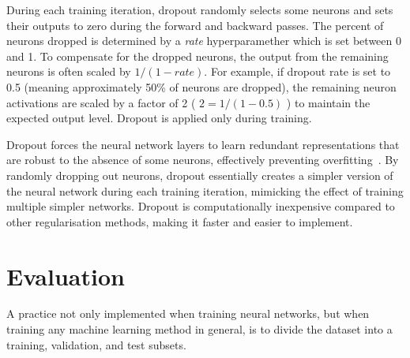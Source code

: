 During each training iteration, dropout randomly selects some neurons and sets their outputs to zero during the forward and backward passes. The percent of neurons dropped is determined by a \textit{rate} hyperparamether which is set between 0 and 1. To compensate for the dropped neurons, the output from the remaining neurons is often scaled by $1/(1 - rate)$. For example, if dropout rate  is set to 0.5 (meaning approximately 50\% of neurons are dropped), the remaining neuron activations are scaled by a factor of 2 ( $2 = 1/(1 - 0.5)$ ) to maintain the expected output level. Dropout is applied only during training. 

Dropout forces the neural network layers to learn redundant representations that are robust to the absence of some neurons, effectively preventing overfitting~\cite{srivastava2014dropout}. By randomly dropping out neurons, dropout essentially creates a simpler version of the neural network during each training iteration, mimicking the effect of training multiple simpler networks. Dropout is computationally inexpensive compared to other regularisation methods, making it faster and easier to implement.


\section{Evaluation}

\label{setup}
A practice not only implemented when training neural networks, but when training any machine learning method in general, is to divide the dataset into a training, validation, and test subsets.

